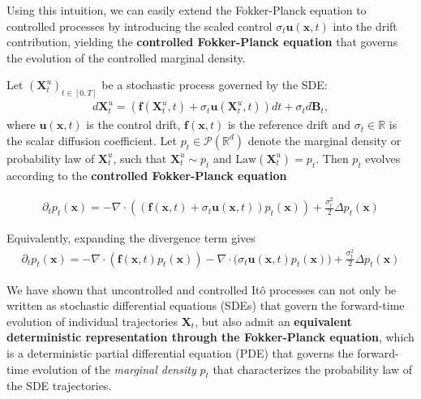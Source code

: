\documentclass{article}
\newcommand{\boldtext}[1]{\textbf{\textcolor{MyGreen}{#1}}}
\begin{document}
Using this intuition, we can easily extend the Fokker-Planck equation to controlled processes by introducing the scaled control $\sigma_t\boldsymbol{u}(\boldsymbol{x},t)$ into the drift contribution, yielding the \boldtext{controlled Fokker-Planck equation} that governs the evolution of the controlled marginal density.

\begin{corollary}
\label{cor:controlled-fp}
Let $(\boldsymbol{X}^u_t)_{t\in [0,T]}$ be a stochastic process governed by the SDE:
\begin{align}
    d\boldsymbol{X}^u_t = \left(\boldsymbol{f}(\boldsymbol{X}^u_t,t) + \sigma_t \boldsymbol{u}(\boldsymbol{X}^u_t,t)\right)dt + \sigma_t d\boldsymbol{B}_t,
\end{align}
where $\boldsymbol{u}(\boldsymbol{x},t)$ is the control drift, $\boldsymbol{f}(\boldsymbol{x},t)$ is the reference drift and $\sigma_t\in \mathbb{R}$ is the scalar diffusion coefficient. Let $p_t\in \mathcal{P}(\mathbb{R}^d)$ denote the marginal density or probability law of $\boldsymbol{X}^u_t$, such that $\boldsymbol{X}^u_t \sim p_t$ and $\text{Law}(\boldsymbol{X}_t^u)=p_t$. Then $p_t$ evolves according to the \textbf{controlled Fokker-Planck equation}
\begin{small}
\begin{align}
    \partial_t p_t(\boldsymbol{x})=-\nabla \cdot\left(\left(\boldsymbol{f}(\boldsymbol{x},t)+\sigma_t\boldsymbol{u}(\boldsymbol{x},t)\right)p_t(\boldsymbol{x})\right)+\frac{\sigma_t^2}{2} \Delta p_t(\boldsymbol{x})\tag{Controlled Fokker-Planck Equation}\label{eq:controlled-fp-equation}
\end{align}
\end{small}
Equivalently, expanding the divergence term gives
\begin{align}
    \partial_t p_t(\boldsymbol{x})=-\nabla \cdot\left(\boldsymbol{f}(\boldsymbol{x},t)p_t(\boldsymbol{x})\right)-\nabla \cdot\bigl(\sigma_t\boldsymbol{u}(\boldsymbol{x},t)p_t(\boldsymbol{x})\bigr)
    + \frac{\sigma_t^2}{2} \Delta p_t(\boldsymbol{x})
\end{align}
\end{corollary}

We have shown that uncontrolled and controlled Itô processes can not only be written as stochastic differential equations (SDEs) that govern the forward-time evolution of individual trajectories $\boldsymbol{X}_t$, but also admit an \textbf{equivalent deterministic representation through the Fokker-Planck equation}, which is a deterministic partial differential equation (PDE) that governs the forward-time evolution of the \textit{marginal density} $p_t$ that characterizes the probability law of the SDE trajectories. 
\end{document}
